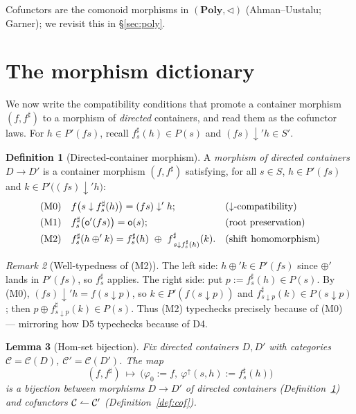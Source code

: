 \documentclass[11pt,a4paper]{article}
\newcommand{\co}{\mathrel{\text{\reflectbox{$\rightharpoonup$}}}}
\theoremstyle{definition}\newtheorem{definition}{Definition}[section]
\theoremstyle{plain}\newtheorem{proposition}[definition]{Proposition}
\newtheorem{lemma}[definition]{Lemma}
\theoremstyle{remark}\newtheorem{example}[definition]{Example}
\newtheorem{remark}[definition]{Remark}
\begin{document}
Cofunctors are the comonoid morphisms in $(\mathbf{Poly},\triangleleft)$
(Ahman--Uustalu; Garner); we revisit this in \S\ref{sec:poly}.

\section{The morphism dictionary}

We now write the compatibility conditions that promote a container morphism
$(f,f^\sharp)$ to a morphism of \emph{directed} containers, and read them as
the cofunctor laws. For $h\in P'(fs)$, recall $f^\sharp_s(h)\in P(s)$ and
$(fs)\downarrow' h\in S'$.

\begin{definition}[Directed-container morphism]\label{def:dcm}
A \emph{morphism of directed containers} $D\to D'$ is a container morphism
$(f,f^\sharp)$ satisfying, for all $s\in S$, $h\in P'(fs)$ and
$k\in P'\big((fs)\downarrow' h\big)$:
\begin{align}
  &\text{(M0)} && f\big(s\downarrow f^\sharp_s(h)\big) = (fs)\downarrow' h;
        &&\text{($\downarrow$-compatibility)}\notag\\
  &\text{(M1)} && f^\sharp_s\big(\mathsf o'(fs)\big) = \mathsf o(s);
        &&\text{(root preservation)}\notag\\
  &\text{(M2)} && f^\sharp_s(h\oplus' k)
        = f^\sharp_s(h)\ \oplus\ f^\sharp_{\,s\downarrow f^\sharp_s(h)}(k).
        &&\text{(shift homomorphism)}\notag
\end{align}
\end{definition}

\begin{remark}[Well-typedness of (M2)]
The left side: $h\oplus' k\in P'(fs)$ since $\oplus'$ lands in $P'(fs)$, so
$f^\sharp_s$ applies. The right side: put $p:=f^\sharp_s(h)\in P(s)$. By (M0),
$(fs)\downarrow' h = f(s\downarrow p)$, so $k\in P'(f(s\downarrow p))$ and
$f^\sharp_{s\downarrow p}(k)\in P(s\downarrow p)$; then
$p\oplus f^\sharp_{s\downarrow p}(k)\in P(s)$. Thus (M2) typechecks precisely
because of (M0) --- mirroring how D5 typechecks because of D4.
\end{remark}

\begin{lemma}[Hom-set bijection]\label{lem:hom}
Fix directed containers $D,D'$ with categories $\mathcal C=\mathcal C(D)$,
$\mathcal C'=\mathcal C(D')$. The map
\[
  (f,f^\sharp)\ \longmapsto\ \big(\varphi_0:=f,\ \varphi^\uparrow(s,h):=f^\sharp_s(h)\big)
\]
is a bijection between morphisms $D\to D'$ of directed containers
(Definition~\ref{def:dcm}) and cofunctors
$\mathcal C\co\mathcal C'$ (Definition~\ref{def:cof}).
\end{lemma}
\end{document}
